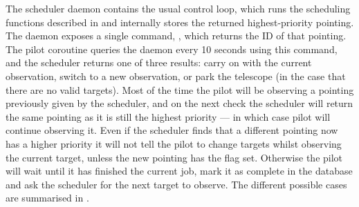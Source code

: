 \begin{colsection}
The scheduler daemon contains the usual control loop, which runs the scheduling functions described in  and internally stores the returned highest-priority pointing. The daemon exposes a single command, , which returns the ID of that pointing. The pilot  coroutine queries the daemon every 10 seconds using this command, and the scheduler returns one of three results: carry on with the current observation, switch to a new observation, or park the telescope (in the case that there are no valid targets). Most of the time the pilot will be observing a pointing previously given by the scheduler, and on the next check the scheduler will return the same pointing as it is still the highest priority --- in which case pilot will continue observing it. Even if the scheduler finds that a different pointing now has a higher priority it will not tell the pilot to change targets whilst observing the current target, unless the new pointing has the  flag set. Otherwise the pilot will wait until it has finished the current job, mark it as complete in the database and ask the scheduler for the next target to observe. The different possible cases are summarised in .



\end{colsection}
